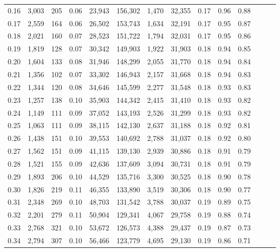 \begin{tabular}{rrrrrrrrrrrrrr}
0.16 &  3,003 &  205 &  0.06 &   23,943 &  156,302 &   1,470 &  32,355 &  0.17 &  0.96 &      0.88 \\
0.17 &  2,559 &  164 &  0.06 &   26,502 &  153,743 &   1,634 &  32,191 &  0.17 &  0.95 &      0.87 \\
0.18 &  2,021 &  160 &  0.07 &   28,523 &  151,722 &   1,794 &  32,031 &  0.17 &  0.95 &      0.86 \\
0.19 &  1,819 &  128 &  0.07 &   30,342 &  149,903 &   1,922 &  31,903 &  0.18 &  0.94 &      0.85 \\
0.20 &  1,604 &  133 &  0.08 &   31,946 &  148,299 &   2,055 &  31,770 &  0.18 &  0.94 &      0.84 \\
0.21 &  1,356 &  102 &  0.07 &   33,302 &  146,943 &   2,157 &  31,668 &  0.18 &  0.94 &      0.83 \\
0.22 &  1,344 &  120 &  0.08 &   34,646 &  145,599 &   2,277 &  31,548 &  0.18 &  0.93 &      0.83 \\
0.23 &  1,257 &  138 &  0.10 &   35,903 &  144,342 &   2,415 &  31,410 &  0.18 &  0.93 &      0.82 \\
0.24 &  1,149 &  111 &  0.09 &   37,052 &  143,193 &   2,526 &  31,299 &  0.18 &  0.93 &      0.82 \\
0.25 &  1,063 &  111 &  0.09 &   38,115 &  142,130 &   2,637 &  31,188 &  0.18 &  0.92 &      0.81 \\
0.26 &  1,438 &  151 &  0.10 &   39,553 &  140,692 &   2,788 &  31,037 &  0.18 &  0.92 &      0.80 \\
0.27 &  1,562 &  151 &  0.09 &   41,115 &  139,130 &   2,939 &  30,886 &  0.18 &  0.91 &      0.79 \\
0.28 &  1,521 &  155 &  0.09 &   42,636 &  137,609 &   3,094 &  30,731 &  0.18 &  0.91 &      0.79 \\
0.29 &  1,893 &  206 &  0.10 &   44,529 &  135,716 &   3,300 &  30,525 &  0.18 &  0.90 &      0.78 \\
0.30 &  1,826 &  219 &  0.11 &   46,355 &  133,890 &   3,519 &  30,306 &  0.18 &  0.90 &      0.77 \\
0.31 &  2,348 &  269 &  0.10 &   48,703 &  131,542 &   3,788 &  30,037 &  0.19 &  0.89 &      0.75 \\
0.32 &  2,201 &  279 &  0.11 &   50,904 &  129,341 &   4,067 &  29,758 &  0.19 &  0.88 &      0.74 \\
0.33 &  2,768 &  321 &  0.10 &   53,672 &  126,573 &   4,388 &  29,437 &  0.19 &  0.87 &      0.73 \\
0.34 &  2,794 &  307 &  0.10 &   56,466 &  123,779 &   4,695 &  29,130 &  0.19 &  0.86 &      0.71 \\

\end{tabular}
